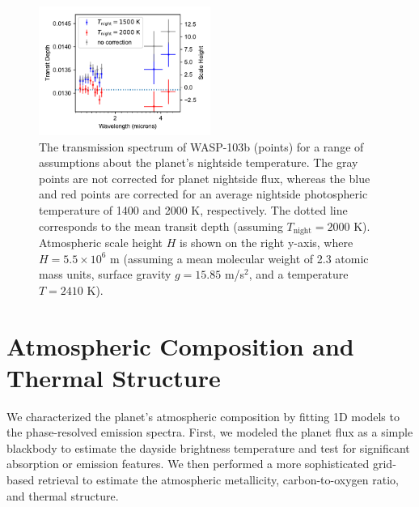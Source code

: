 \documentclass[twocolumn]{aastex61}
\begin{document}
\begin{figure}
\includegraphics[width = 0.5\textwidth]{Figures/w103b_transmission_spectrum.pdf}
\caption{The transmission spectrum of WASP-103b (points) for a range of assumptions about the planet's nightside temperature. The gray points are not corrected for planet nightside flux, whereas the blue and red points are corrected for an average nightside photospheric temperature of 1400 and 2000 K, respectively. The dotted line corresponds to the mean transit depth (assuming $T_\mathrm{night} = 2000$ K). Atmospheric scale height $H$ is shown on the right y-axis, where $H = 5.5\times10^6$ m (assuming a mean molecular weight of 2.3 atomic mass units, surface gravity $g = 15.85$ m/s$^2$, and a temperature $T = 2410$ K).}
\label{fig:tspec}
\end{figure}



\section{Atmospheric Composition and Thermal Structure}
\label{sec:composition}
We characterized the planet's atmospheric composition by fitting 1D models to the phase-resolved emission spectra.  First, we modeled the planet flux as a simple blackbody to estimate the dayside brightness temperature and test for significant absorption or emission features. We then performed a more sophisticated grid-based retrieval to estimate the atmospheric metallicity, carbon-to-oxygen ratio, and thermal structure.
\end{document}
